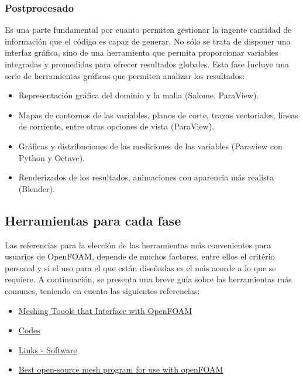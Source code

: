 \subsubsection{Postprocesado}

Es una parte fundamental por cuanto permiten gestionar la ingente
cantidad de información que el código es capaz de generar. No sólo se
trata de disponer una interfaz gráfica, sino de una herramienta que
permita proporcionar variables integradas y promedidas para ofrecer
resultados globales. Esta fase Incluye una serie de herramientas
gráficas que permiten analizar los resultados:

\begin{itemize}
\item
  Representación gráfica del dominio y la malla (Salome, ParaView).
\item
  Mapas de contornos de las variables, planos de corte, trazas
  vectoriales, líneas de corriente, entre otras opciones de vista
  (ParaView).
\item
  Gráficas y distribuciones de las mediciones de las variables
  (Paraview con Python y Octave).
\item
  Renderizados de los resultados, animaciones con aparencia más
  realista (Blender).
\end{itemize}

\subsection{Herramientas para cada fase}\label{header-n52}

Las referencias para la elección de las herramientas más convenientes
para usuarios de OpenFOAM, depende de muchos factores, entre ellos el
critério personal y si el uso para el que están diseñadas es el más
acorde a lo que se requiere. A continuación, se presenta una breve guía
sobre las herramientas más comunes, teniendo en cuenta las siguientes
referencias:

\begin{itemize}
\item
  \href{https://github.com/NanoSim/CoursesAndTrainingPortfolio/blob/master/3_EulerianModels/meshingTools.md}{Meshing
  Toools that Interface with OpenFOAM}
\item
  \href{https://www.cfd-online.com/Wiki/Codes}{Codes}
\item
  \href{https://www.cfd-online.com/Links/soft.html}{Links - Software}
\item
  \href{https://www.reddit.com/r/CFD/comments/18ydig/best_opensource_mesh_program_for_use_with_openfoam/}{Best
  open-source mesh program for use with openFOAM}
\end{itemize}

